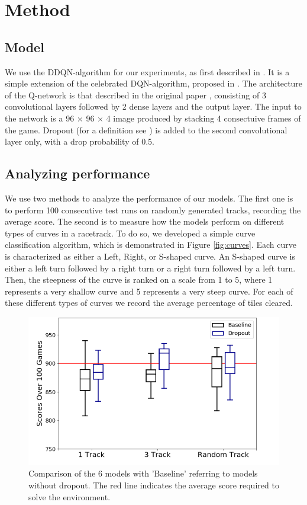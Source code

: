 \documentclass{article}
\begin{document}
\section{Method}

\subsection{Model}
We use the DDQN-algorithm for our experiments, as first described in \cite{DDQN}. It is a simple extension of the celebrated DQN-algorithm, 
proposed in \cite{DQN}. The architecture of the Q-network is that described in the original paper \cite{DQN}, consisting of
3 convolutional layers followed by 2 dense layers and the output layer. The input to the network is a 96 $\times$ 96 $\times$ 4 image 
produced by stacking 4 consectuive frames of the game. Dropout (for a definition see \cite{Dropout}) is added to the second convolutional layer only, with a drop probability of 0.5. 

\subsection{Analyzing performance}
We use two methods to analyze the performance of our models. The first one is to perform 100 consecutive test runs on randomly generated tracks, recording the average score. The second is to measure how the models perform on different types of curves in a racetrack. To do so, we developed a simple curve classification algorithm, which is demonstrated in Figure \ref{fig:curves}. Each curve is characterized as either a Left, Right, or S-shaped curve. An S-shaped curve is either a left turn followed by a right turn or a right turn followed by a left turn. Then, the steepness of the curve is ranked on a scale from 1 to 5, where 1 represents a very shallow curve and 5 represents a very steep curve. For each of these different types of curves we record the average percentage of tiles cleared.  

\begin{figure}[!h]
\captionsetup{justification=centering}
\centering
\centering
\includegraphics[width=\linewidth]{Graphics/scores_notitle.png}
\caption{Comparison of the 6 models with 'Baseline' referring to models without dropout. The red line indicates the average score required to solve the environment. }
\label{fig:scores}
\end{figure}
\end{document}
